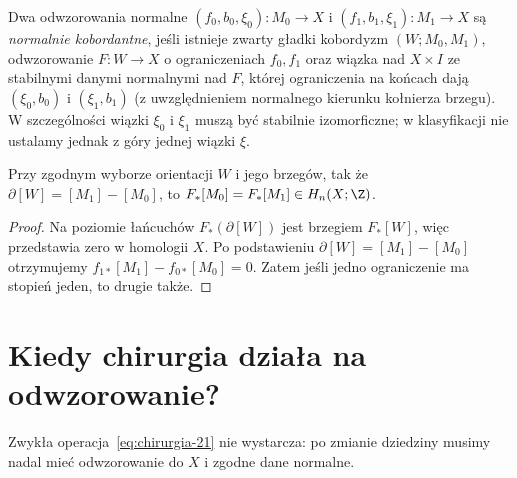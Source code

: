 \begin{definicja}
\label{def:normal-bordism-21}
Dwa odwzorowania normalne $(f_0,b_0,\xi_0):M_0\to X$
i $(f_1,b_1,\xi_1):M_1\to X$ są \emph{normalnie
kobordantne}, jeśli istnieje zwarty gładki kobordyzm
$(W;M_0,M_1)$, odwzorowanie $F:W\to X$
o ograniczeniach $f_0,f_1$ oraz wiązka
nad $X\times I$ ze stabilnymi danymi normalnymi
nad $F$, której ograniczenia na końcach dają
$(\xi_0,b_0)$ i $(\xi_1,b_1)$ (z uwzględnieniem
normalnego kierunku kołnierza brzegu).
W szczególności wiązki $\xi_0$ i $\xi_1$
muszą być stabilnie izomorficzne; w klasyfikacji
nie ustalamy jednak z góry jednej wiązki $\xi$.
\end{definicja}

\begin{stwierdzenie}
\label{prop:stopien-kobordancja-21}
Przy zgodnym wyborze orientacji $W$ i jego brzegów,
tak że
$\partial[W]=[M_1]-[M_0]$, to
$F_*[M_0]=F_*[M_1]\in H_n(X;\Z)$.
\end{stwierdzenie}
\begin{proof}
Na poziomie łańcuchów $F_*(\partial[W])$
jest brzegiem $F_*[W]$, więc przedstawia zero
w homologii $X$. Po podstawieniu
$\partial[W]=[M_1]-[M_0]$ otrzymujemy
$f_{1*}[M_1]-f_{0*}[M_0]=0$.
Zatem jeśli jedno ograniczenie ma stopień jeden,
to drugie także.
\end{proof}

\section{Kiedy chirurgia działa na odwzorowanie?}
\label{sec:normalny-krok-21}

Zwykła operacja~\eqref{eq:chirurgia-21} nie
wystarcza: po zmianie dziedziny musimy nadal
mieć odwzorowanie do $X$ i zgodne dane normalne.

